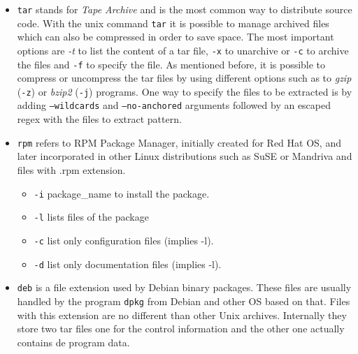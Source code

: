 \documentclass[10pt,a4paper]{article}
\begin{document}
	\begin{itemize}
		\item \texttt{tar} stands for \textit{Tape Archive} and is the most common way to distribute source code. With the unix command \texttt{tar} it is possible to manage archived files which can also be compressed in order to save space. The most important options are \textit{-t} to list the content of a tar file, \texttt{-x} to unarchive or \texttt{-c} to archive the files and \texttt{-f} to specify the file. As mentioned before, it is possible to compress or uncompress the tar files by using different options such as to \textit{gzip} (\texttt{-z}) or \textit{bzip2} (\texttt{-j}) programs. One way to specify the files to be extracted is by adding \texttt{--wildcards} and \texttt{--no-anchored} arguments followed by an escaped regex with the files to extract pattern.
		
		
		\item \texttt{rpm} refers to RPM Package Manager, initially created for Red Hat OS, and later incorporated in other Linux distributions such as SuSE or Mandriva and files with .rpm extension.
		\begin{itemize}
			\item[] \texttt{-i} package\_name to install the package.
			\item[] \texttt{-l} lists files of the package
			\item[] \texttt{-c} list only configuration files (implies -l).
			\item[] \texttt{-d} list only documentation files (implies -l).
		\end{itemize}
		
		
		\item \texttt{deb} is a file extension used by Debian binary packages. These files are usually handled by the program \texttt{dpkg} from Debian and other OS based on that. Files with this extension are no different than other Unix archives. Internally they store two tar files one for the control information and the other one actually contains de program data.
		

\end{itemize}
\end{document}
